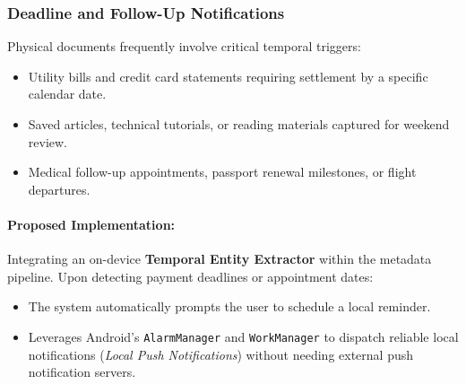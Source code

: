 \subsubsection{Deadline and Follow-Up Notifications}
Physical documents frequently involve critical temporal triggers:
\begin{itemize}
    \item Utility bills and credit card statements requiring settlement by a specific calendar date.
    \item Saved articles, technical tutorials, or reading materials captured for weekend review.
    \item Medical follow-up appointments, passport renewal milestones, or flight departures.
\end{itemize}

\paragraph{Proposed Implementation:}
Integrating an on-device \textbf{Temporal Entity Extractor} within the metadata pipeline. Upon detecting payment deadlines or appointment dates:
\begin{itemize}
    \item The system automatically prompts the user to schedule a local reminder.
    \item Leverages Android's \texttt{AlarmManager} and \texttt{WorkManager} to dispatch reliable local notifications (\textit{Local Push Notifications}) without needing external push notification servers.
\end{itemize}
